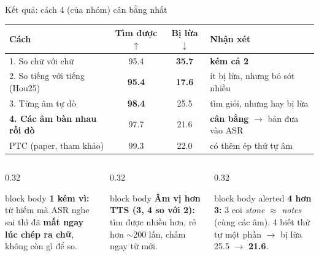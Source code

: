 \documentclass[aspectratio=169,xcolor=table]{beamer}
\newcommand{\bad}[1]{\textcolor{RiskRed}{\textbf{#1}}}
\newcommand{\good}[1]{\textcolor{GoodGreen}{\textbf{#1}}}
\newcommand{\ra}{$\rightarrow$}
\begin{document}
\begin{frame}{Kết quả: cách 4 (của nhóm) cân bằng nhất}
\centering\small\setlength{\tabcolsep}{6pt}
\begin{tabular}{lccl}
\toprule
Cách & \textbf{Tìm được} $\uparrow$ & \textbf{Bị lừa} $\downarrow$ & Nhận xét\\
\midrule
1. So chữ với chữ & 95.4 & \bad{35.7} & \bad{kém cả 2}\\
2. So tiếng với tiếng (Hou25) & \bad{95.4} & \good{17.6} & ít bị lừa, nhưng bỏ sót nhiều\\
3. Từng âm tự dò & \good{98.4} & 25.5 & tìm giỏi, nhưng hay bị lừa\\
\textbf{4. Các âm bàn nhau rồi dò} & 97.7 & 21.6 & \good{cân bằng} \ra{} bản đưa vào ASR\\
\midrule
{\color{TextGray}PTC (paper, tham khảo)} & {\color{TextGray}99.3} & {\color{TextGray}22.0} & {\color{TextGray}có thêm ép thứ tự âm}\\
\bottomrule
\end{tabular}
\raggedright\vspace{0.3cm}
\begin{columns}[T]
\begin{column}{0.32\textwidth}
\begin{beamercolorbox}[sep=0.45em,rounded=true]{block body}
\footnotesize\textbf{1 kém vì:} từ hiếm mà ASR nghe sai thì đã \textbf{mất ngay lúc chép ra chữ}, không còn gì để so.
\end{beamercolorbox}
\end{column}
\begin{column}{0.32\textwidth}
\begin{beamercolorbox}[sep=0.45em,rounded=true]{block body}
\footnotesize\textbf{Âm vị hơn TTS (3, 4 so với 2):} tìm được nhiều hơn, rẻ hơn $\sim$200 lần, chấm ngay từ mới.
\end{beamercolorbox}
\end{column}
\begin{column}{0.32\textwidth}
\begin{beamercolorbox}[sep=0.45em,rounded=true]{block body alerted}
\footnotesize\textbf{4 hơn 3:} 3 coi \textit{stone} $\approx$ \textit{notes} (cùng các âm). 4 biết thứ tự một phần \ra{} bị lừa 25.5 \ra{} \textbf{21.6}.
\end{beamercolorbox}
\end{column}
\end{columns}
\end{frame}
\end{document}
